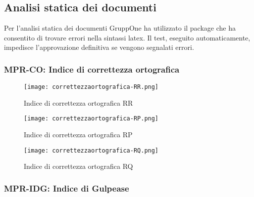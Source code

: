 \documentclass[../piano-di-qualifica.tex]{subfiles}
\begin{document}
\subsection{Analisi statica dei documenti}%
\label{sub:analisi_statica_doc}
Per l'analisi statica dei documenti GruppOne ha utilizzato il package  che ha consentito di trovare errori nella sintassi latex.
Il test, eseguito automaticamente, impedisce l'approvazione definitiva se vengono segnalati errori.

\subsubsection{MPR-CO\@: Indice di correttezza ortografica}%
\label{subs:indice_corr_ortografica}

\begin{figure}[H]
  \centering
  \texttt{[image: correttezzaortografica-RR.png]}%
  \caption{Indice di correttezza ortografica \- RR}%
  \label{fig:indice_correttezza_ortografica_RR}%
\end{figure}


\begin{figure}[H]
  \centering
  \texttt{[image: correttezzaortografica-RP.png]}%
  \caption{Indice di correttezza ortografica \- RP}%
  \label{fig:indice_correttezza_ortografica_RP}%
\end{figure}

\begin{figure}[H]
  \centering
  \texttt{[image: correttezzaortografica-RQ.png]}%
  \caption{Indice di correttezza ortografica \- RQ}%
  \label{fig:indice_correttezza_ortografica_RQ}%
\end{figure}



\subsubsection{MPR-IDG\@: Indice di Gulpease}%
\label{subs:indice_gulpease}
\end{document}
